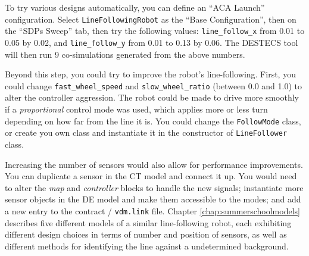 To try various designs automatically, you can define an ``ACA Launch'' configuration. Select \texttt{LineFollowingRobot} as the ``Base Configuration'', then on the ``SDPs Sweep'' tab, then try the following values: \texttt{line\_follow\_x} from 0.01 to 0.05 by 0.02, and \texttt{line\_follow\_y} from 0.01 to 0.13 by 0.06. The DESTECS tool will then run 9 co-simulations generated from the above numbers.

Beyond this step, you could try to improve the robot's line-following. First, you could change \texttt{fast\_wheel\_speed} and \texttt{slow\_wheel\_ratio} (between 0.0 and 1.0) to alter the controller aggression. The robot could be made to drive more smoothly if a \emph{proportional} control mode was used, which applies more or less turn depending on how far from the line it is. You could change the \texttt{FollowMode} class, or create you own class and instantiate it in the constructor of \texttt{LineFollower} class.

Increasing the number of sensors would also allow for performance improvements. You can duplicate a sensor in the CT model and connect it up. You would need to alter the \emph{map} and \emph{controller} blocks to handle the new signals; instantiate more sensor objects in the DE model and make them accessible to the modes; and add a new entry to the contract / \texttt{vdm.link} file. Chapter \ref{chap:summerschoolmodels} describes five
different models of a similar line-following robot, each exhibiting
different design choices in terms of number and position of sensors,
as well as different methods for identifying the line against a
undetermined background.
